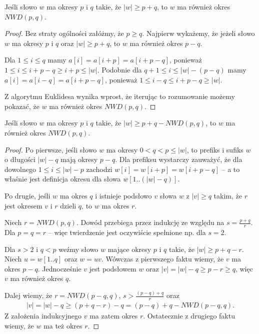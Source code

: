 \begin{theorem-thm}
  Jeśli słowo $w$ ma okresy $p$ i $q$ takie, że $|w| \ge p + q$, to $w$ ma również okres $NWD(p, q)$.
\end{theorem-thm}

\begin{proof}
  Bez straty ogólności załóżmy, że $p \ge q$.
  Najpierw wykażemy, że jeżeli słowo $w$ ma okresy $p$ i $q$ oraz $|w| \ge p + q$, to $w$ ma również okres $p - q$.
  
  Dla $1 \le i \le q$ mamy $a[i] = a[i + p] = a[i + p - q]$, ponieważ $1 \le i \le i + p - q \ge i + p \le |w|$.
  Podobnie dla $q + 1 \le i \le |w| - (p - q)$ mamy $a[i] = a[i - q] = a[i + p - q]$, ponieważ $1 \le i - q \le i + p - q \ge |w|$.

  Z algorytmu Euklidesa wynika wprost, że iterując to rozumowanie możemy pokazać, że $w$ ma również okres $NWD(p, q)$.
\end{proof}

\begin{theorem-thm}
  Jeśli słowo $w$ ma okresy $p$ i $q$ takie, że $|w| \ge p + q - NWD(p, q)$, to $w$ ma również okres $NWD(p, q)$.
\end{theorem-thm}

\begin{proof}%
  Po pierwsze, jeśli słowo $w$ ma okresy $0 < q < p \le |w|$, to prefiks i sufiks $w$ o długości $|w| - q$ mają okresy $p - q$.
  Dla prefiksu wystarczy zauważyć, że dla dowolnego $1 \le i \le |w| - p$ zachodzi $w[i] = w[i + p] = w[i + p - q]$ -- a to właśnie jest definicja okresu dla słowa $w[1..(|w| - q)]$. 

  Po drugie, jeśli $w$ ma okres $q$ i istnieje podsłowo $v$ słowa $w$ z $|v| \ge q$ takim, że $r$ jest okresem $v$ i $r$ dzieli $q$, to $w$ ma okres $r$.
  
  Niech $r = NWD(p, q)$. Dowód przebiega przez indukcję ze względu na $s = \frac{p + q}{r}$. Dla $p = q = r$ -- więc twierdzenie jest oczywiście spełnione np. dla $s = 2$.
  
  Dla $s > 2$ i $q < p$ weźmy słowo $w$ mające okresy $p$ i $q$ takie, że $|w| \ge p + q - r$. Niech $u = w[1..q]$ oraz $w = uv$. Wówczas z pierwszego faktu wiemy, że $v$ ma okres $p - q$.
  Jednocześnie $v$ jest podsłowem $w$ oraz $|v| = |w| - q \ge p - r \ge q$, więc $v$ ma również okres $q$.
  
  Dalej wiemy, że $r = NWD(p - q, q)$, $s > \frac{(p - q) + q}{r}$ oraz
  \begin{align*}
    |v| = |w| - q \ge (p + q - r) - q = (p - q) + q - NWD(p - q, q).
  \end{align*}
  Z założenia indukcyjnego $v$ ma zatem okres $r$. Ostatecznie z drugiego faktu wiemy, że $w$ ma też okres $r$.
\end{proof}

